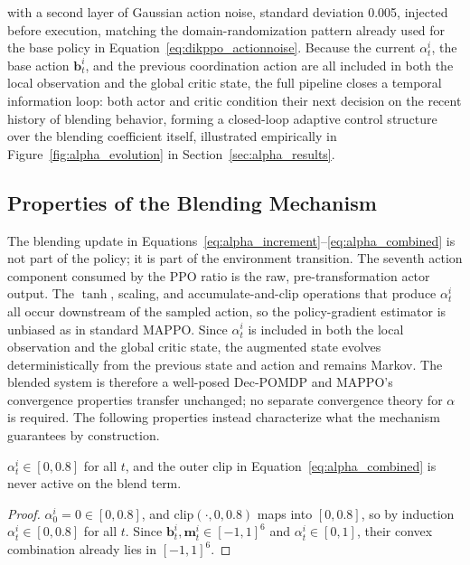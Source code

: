 with a second layer of Gaussian action noise, standard deviation 0.005, injected before execution,
matching the domain-randomization pattern already used for the base policy in
Equation~\eqref{eq:dikppo_actionnoise}. Because the current $\alpha_t^i$, the base action
$\mathbf{b}_t^i$, and the previous coordination action are all included in both the local
observation and the global critic state, the full pipeline closes a temporal information loop: both
actor and critic condition their next decision on the recent history of blending behavior, forming
a closed-loop adaptive control structure over the blending coefficient itself, illustrated
empirically in Figure~\ref{fig:alpha_evolution} in Section~\ref{sec:alpha_results}.


\subsection{Properties of the Blending Mechanism}\label{sec:alpha_properties}

The blending update in Equations~\eqref{eq:alpha_increment}--\eqref{eq:alpha_combined} is not part of
the policy; it is part of the environment transition. The seventh action component consumed by the
PPO ratio is the raw, pre-transformation actor output. The $\tanh$, scaling, and accumulate-and-clip
operations that produce $\alpha_t^i$ all occur downstream of the sampled action, so the
policy-gradient estimator is unbiased as in standard MAPPO. Since $\alpha_t^i$ is included in both the
local observation and the global critic state, the augmented state evolves deterministically from the
previous state and action and remains Markov. The blended system is therefore a well-posed Dec-POMDP
and MAPPO's convergence properties transfer unchanged; no separate convergence theory for $\alpha$ is
required. The following properties instead characterize what the mechanism guarantees by
construction.

\begin{proposition}[Invariance]\label{prop:invariance}
$\alpha_t^i \in [0, 0.8]$ for all $t$, and the outer clip in Equation~\eqref{eq:alpha_combined} is never
active on the blend term.
\end{proposition}
\begin{proof}
$\alpha_0^i = 0 \in [0,0.8]$, and $\mathrm{clip}(\cdot, 0, 0.8)$ maps into $[0,0.8]$, so by induction
$\alpha_t^i \in [0,0.8]$ for all $t$. Since $\mathbf{b}_t^i, \mathbf{m}_t^i \in [-1,1]^6$ and
$\alpha_t^i \in [0,1]$, their convex combination already lies in $[-1,1]^6$.
\end{proof}

